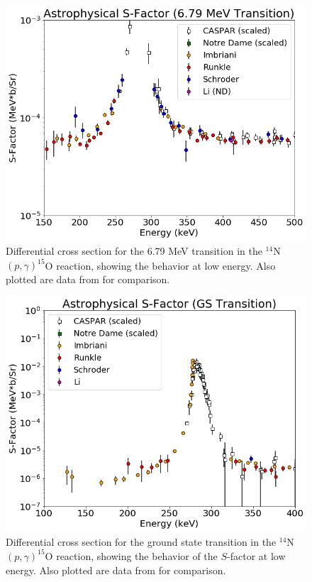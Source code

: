 \begin{figure}
		\includegraphics[width=1.0\linewidth]{figures/low679.png}
	\caption{Differential cross section for the 6.79 MeV transition in the $^{14}$N$\left( p,\gamma \right) ^{15}$O reaction, showing the behavior at low energy. Also plotted are data from \cite{Schroder1987, Imbriani2005, Runkle2005, Li2016} for comparison. }
	\label{fig: low679}
\end{figure}


\begin{figure}
		\includegraphics[width=1.0\linewidth]{figures/lowGS.png}
	\caption{Differential cross section for the ground state transition in the $^{14}$N$\left( p,\gamma \right) ^{15}$O reaction, showing the behavior of the $S$-factor at low energy. Also plotted are data from \cite{Schroder1987, Imbriani2005, Runkle2005, Li2016} for comparison. }
	\label{fig: lowGS}
\end{figure}


